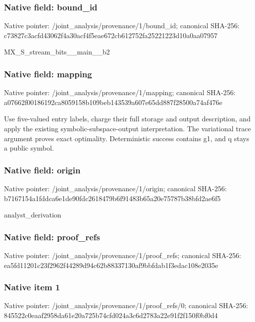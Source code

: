 \documentclass[10pt,a4paper]{article}
\begin{document}
\subsubsection{Native field: bound\_\allowbreak{}id}
Native pointer: /joint\_\allowbreak{}analysis/provenance/1/bound\_\allowbreak{}id; canonical SHA-256: c73827c3acfd43062f4a30acf4f5eae672cb612752fa25221223d10a0aa07957

\begingroup\raggedright\sloppy MX\_\allowbreak{}S\_\allowbreak{}stream\_\allowbreak{}bits\_\allowbreak{}\_\allowbreak{}main\_\allowbreak{}\_\allowbreak{}b2\par\endgroup

\subsubsection{Native field: mapping}
Native pointer: /joint\_\allowbreak{}analysis/provenance/1/mapping; canonical SHA-256: a07662f00186192ca8059158b109beb143539a607e65dd887f28500a74af476e

\begingroup\raggedright\sloppy Use five-valued entry labels,\allowbreak{} charge their full storage and output description,\allowbreak{} and apply the existing symbolic-subspace-output interpretation. The variational trace argument proves exact optimality. Deterministic success contains g1,\allowbreak{} and q stays a public symbol.\par\endgroup

\subsubsection{Native field: origin}
Native pointer: /joint\_\allowbreak{}analysis/provenance/1/origin; canonical SHA-256: b7167154a1fddca6e1de90fdc2618479b6f91483b65a20e75787b38bfd2ae6f5

\begingroup\raggedright\sloppy analyst\_\allowbreak{}derivation\par\endgroup

\subsubsection{Native field: proof\_\allowbreak{}refs}
Native pointer: /joint\_\allowbreak{}analysis/provenance/1/proof\_\allowbreak{}refs; canonical SHA-256: ea5fd11201c23f2962f44289d94c62b88337130af9bbfdab1f3edac108e2035e

\subsubsection{Native item 1}
Native pointer: /joint\_\allowbreak{}analysis/provenance/1/proof\_\allowbreak{}refs/0; canonical SHA-256: 845522c0eaaf2958da61e20a725b74cfd024a3c6d2783a22e91f2f150f0bf0d4
\end{document}
